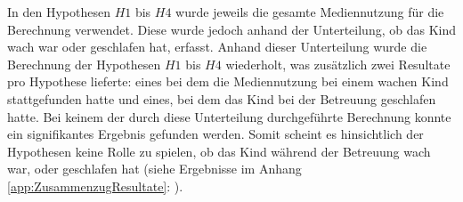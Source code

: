 In den Hypothesen $H1$ bis $H4$ wurde jeweils die gesamte Mediennutzung für die Berechnung verwendet. Diese wurde jedoch anhand der Unterteilung, ob das Kind wach war oder geschlafen hat, erfasst. Anhand dieser Unterteilung wurde die Berechnung der Hypothesen $H1$ bis $H4$ wiederholt, was zusätzlich zwei Resultate pro Hypothese lieferte: eines bei dem die Mediennutzung bei einem wachen Kind stattgefunden hatte und eines, bei dem das Kind bei der Betreuung geschlafen hatte. Bei keinem der durch diese Unterteilung durchgeführte Berechnung konnte ein signifikantes Ergebnis gefunden werden. Somit scheint es hinsichtlich der Hypothesen keine Rolle zu spielen, ob das Kind während der Betreuung wach war, oder geschlafen hat (siehe Ergebnisse im Anhang \ref{app:ZusammenzugResultate}: \textit{}). 

